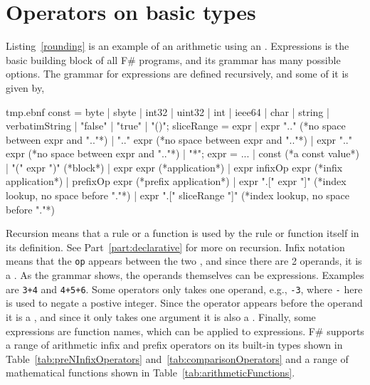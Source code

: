 \section{Operators on basic types}
Listing~\ref{rounding} is an example of an arithmetic  using an . Expressions is the basic building block of all F\# programs, and its grammar has many possible options. The grammar for expressions are defined recursively, and some of it is given by, 
%
\begin{verbatimwrite}{tmp.ebnf}
const =
  byte
  | sbyte
  | int32
  | uint32 
  | int
  | ieee64 
  | char
  | string
  | verbatimString
  | "false"
  | "true"
  | "()";
sliceRange = 
  expr 
  | expr ".." (*no space between expr and ".."*)
  | ".." expr (*no space between expr and ".."*)
  | expr ".." expr (*no space between expr and ".."*)
  | "*";
expr = ...
  | const (*a const value*)
  | "(" expr ")" (*block*)
  | expr expr (*application*)
  | expr infixOp expr (*infix application*)
  | prefixOp expr (*prefix application*)
  | expr ".[" expr "]" (*index lookup, no space before "."*)
  | expr ".[" sliceRange "]" (*index lookup, no space before "."*)
\end{verbatimwrite}
%
Recursion means that a rule or a function is used by the rule or function itself in its definition. See Part~\ref{part:declarative} for more on recursion. Infix notation means that the  \lstinline[language=ebnf]!op! appears between the two , and since there are 2 operands, it is a . As the grammar shows, the operands themselves can be expressions. Examples are \lstinline!3+4! and \lstinline!4+5+6!. Some operators only takes one operand, e.g., \lstinline!-3!, where \lstinline!-! here is used to negate a postive integer. Since the operator appears before the operand it is a , and since it only takes one argument it is also a . Finally, some expressions are function names, which can be applied to expressions. F\# supports a range of arithmetic infix and prefix operators on its built-in types shown in Table~\ref{tab:preNInfixOperators} and~\ref{tab:comparisonOperators} and a range of mathematical functions shown in Table~\ref{tab:arithmeticFunctions}.
